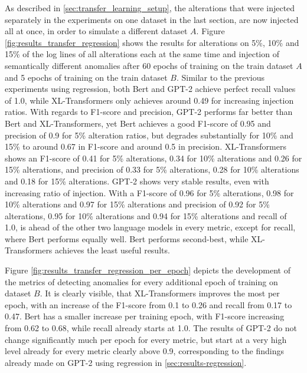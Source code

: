 As described in \ref{sec:transfer_learning_setup}, the alterations that were injected separately in the experiments on one dataset in the last section, are now injected all at once, in order to simulate a different dataset $A$. Figure \ref{fig:results_transfer_regression} shows the results for alterations on 5\%, 10\% and 15\% of the log lines of all alterations each at the same time and injection of semantically different anomalies after 60 epochs of training on the train dataset $A$ and 5 epochs of training on the train dataset $B$. 
Similar to the previous experiments using regression, both Bert and GPT-2 achieve perfect recall values of 1.0, while XL-Transformers only achieves around 0.49 for increasing injection ratios. With regards to F1-score and precision, GPT-2 performs far better than Bert and XL-Transformers, yet Bert achieves a good F1-score of 0.95 and precision of 0.9 for 5\% alteration ratios, but degrades substantially for 10\% and 15\% to around 0.67 in F1-score and around 0.5 in precision. XL-Transformers shows an F1-score of 0.41 for 5\% alterations, 0.34 for 10\% alterations and 0.26 for 15\% alterations, and precision of 0.33 for 5\% alterations, 0.28 for 10\% alterations and 0.18 for 15\% alterations. GPT-2 shows very stable results, even with increasing ratio of injection. With a F1-score of 0.96 for 5\% alterations, 0.98 for 10\% alterations and 0.97 for 15\% alterations and precision of 0.92 for 5\% alterations, 0.95 for 10\% alterations and 0.94 for 15\% alterations and recall of 1.0, is ahead of the other two language models in every metric, except for recall, where Bert performs equally well. Bert performs second-best, while XL-Transformers achieves the least useful results.

Figure \ref{fig:results_transfer_regression_per_epoch} depicts the development of the metrics of detecting anomalies for every additional epoch of training on dataset $B$. It is clearly visible, that XL-Transformers improves the most per epoch, with an increase of the F1-score from 0.1 to 0.26 and recall from 0.17 to 0.47. Bert has a smaller increase per training epoch, with F1-score increasing from 0.62 to 0.68, while recall already starts at 1.0. The results of GPT-2 do not change significantly much per epoch for every metric, but start at a very high level already for every metric clearly above 0.9, corresponding to the findings already made on GPT-2 using regression in \ref{sec:results-regression}.

